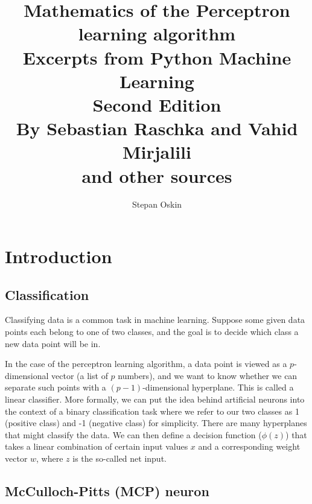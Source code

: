 \documentclass[11pt]{article}
\begin{document}
    \title{Mathematics of the Perceptron learning algorithm\\
    Excerpts from Python Machine Learning \\
    Second Edition \\
    By Sebastian Raschka and Vahid Mirjalili\cite{RaschkaMirjalili2017} \\
    and other sources}

    \author{Stepan Oskin}

    \maketitle

    \begin{abstract}


    \end{abstract}

    \section{Introduction} \label{sec:perc_intro}

    \subsection{Classification} \label{subsec:classification}

    Classifying data is a common task in machine learning.
    Suppose some given data points each belong to one of two classes, and the goal is to decide which class a
    new data point will be in.

    In the case of the perceptron learning algorithm, a data point is viewed as a $p$-dimensional vector
    (a list of $p$ numbers), and we want to know whether we can separate such points with
    a $(p-1)$-dimensional hyperplane.
    This is called a linear classifier.
    More formally, we can put the idea behind artificial neurons into the context of a binary classification task where we refer to our two classes as 1 (positive class) and -1 (negative class) for simplicity.
    There are many hyperplanes that might classify the data.
    We can then define a decision function ($\phi(z)$) that takes a linear combination of certain input values $x$ and a corresponding weight vector $w$, where $z$ is the so-called net input.

    \subsection{McCulloch-Pitts (MCP) neuron} \label{subsec:mcp}
\end{document}
